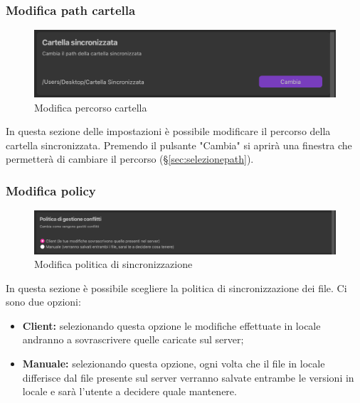 \subsubsection{Modifica path cartella}
\label{sec:cartella}
\begin{figure}[H]
    \centering
    \includegraphics[scale = 1]{components/img/ImpCartella.png}
    \caption{Modifica percorso cartella}
    \label{fig:cartella}
\end{figure}
In questa sezione delle impostazioni è possibile modificare il percorso della cartella sincronizzata. Premendo il pulsante "Cambia" si aprirà una finestra che permetterà di cambiare il percorso (\S{}\ref{sec:selezionepath}).

\subsubsection{Modifica policy}
\label{sec:policy}
\begin{figure}[H]
    \centering
    \includegraphics[scale = 0.4]{components/img/ImpPolicy.png}
    \caption{Modifica politica di sincronizzazione}
    \label{fig:policy}
\end{figure}
In questa sezione è possibile scegliere la politica di sincronizzazione dei file. Ci sono due opzioni:
\begin{itemize}
\item\textbf{Client:} selezionando questa opzione le modifiche effettuate in locale andranno a sovrascrivere quelle caricate sul server;\
\item\textbf{Manuale:} selezionando questa opzione, ogni volta che il file in locale differisce dal file presente sul server verranno salvate entrambe le versioni in locale e sarà l'utente a decidere quale mantenere.\
\end{itemize}

